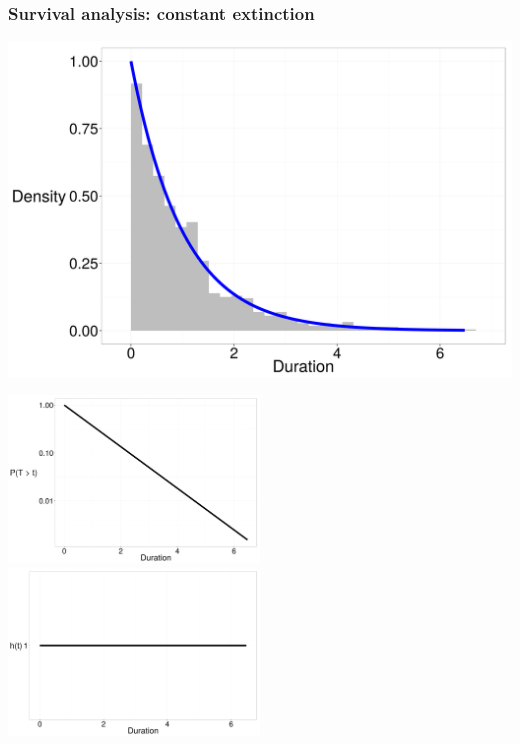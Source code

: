 \documentclass{beamer}
\begin{document}
\begin{frame}
  \frametitle{Survival analysis: constant extinction}

  \begin{center}
    \includegraphics[height = 0.4\textheight, width = \textwidth, keepaspectratio = true]{figure/dur_exp}

    \includegraphics[height = 0.6\textheight, width = 0.5\textwidth, keepaspectratio = true]{figure/sur_exp}
    \includegraphics[height = 0.6\textheight, width = 0.5\textwidth, keepaspectratio = true]{figure/haz_exp}
  \end{center}
\end{frame}
\end{document}
